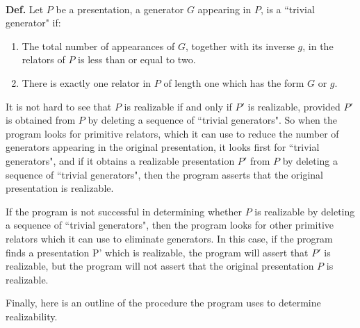 \documentclass[12pt]{amsart}
\newcommand{\definition}{\ \\ \noindent \textbf{Def.} }
\begin{document}
        \definition     Let $P$ be a presentation, a generator $G$ appearing in $P$, is a  ``trivial generator" if:
        \begin{enumerate}
                        \item     The total number of appearances of $G$, together with its inverse $g$, in the
                                relators of $P$ is less than or equal to two.
                        \item      There is exactly one relator in $P$ of length one which has the form $G$ or $g$.        
        \end{enumerate}
        It is not hard to see that $P$ is realizable if and only if $P'$ is realizable, provided $P'$ is
        obtained from $P$ by deleting a sequence of  ``trivial generators".       So when the program looks
        for primitive relators, which it can use to reduce the number of generators appearing in the
        original presentation, it looks first for  ``trivial generators", and if it obtains a
        realizable presentation $P'$ from $P$ by deleting a sequence of  ``trivial generators", then the
        program asserts that the original presentation is realizable.

                If the program is not successful in determining whether $P$ is realizable by deleting a
        sequence of  ``trivial generators", then the program looks for other primitive relators which
        it can use to eliminate generators. In this case, if the program finds a presentation P'
        which is realizable, the program will assert that $P'$ is realizable, but the program will not
        assert that the original presentation $P$ is realizable.                
        
        Finally, here is an outline of the procedure the program uses to determine realizability.
\end{document}

